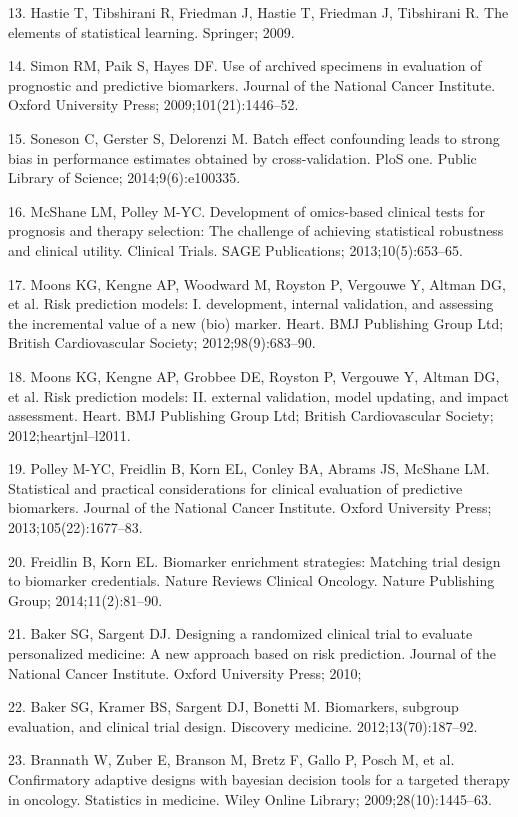\documentclass[11pt]{article}
\begin{document}
13. Hastie T, Tibshirani R, Friedman J, Hastie T, Friedman J, Tibshirani
R. The elements of statistical learning. Springer; 2009.

14. Simon RM, Paik S, Hayes DF. Use of archived specimens in evaluation
of prognostic and predictive biomarkers. Journal of the National Cancer
Institute. Oxford University Press; 2009;101(21):1446--52.

15. Soneson C, Gerster S, Delorenzi M. Batch effect confounding leads to
strong bias in performance estimates obtained by cross-validation. PloS
one. Public Library of Science; 2014;9(6):e100335.

16. McShane LM, Polley M-YC. Development of omics-based clinical tests
for prognosis and therapy selection: The challenge of achieving
statistical robustness and clinical utility. Clinical Trials. SAGE
Publications; 2013;10(5):653--65.

17. Moons KG, Kengne AP, Woodward M, Royston P, Vergouwe Y, Altman DG,
et al. Risk prediction models: I. development, internal validation, and
assessing the incremental value of a new (bio) marker. Heart. BMJ
Publishing Group Ltd; British Cardiovascular Society;
2012;98(9):683--90.

18. Moons KG, Kengne AP, Grobbee DE, Royston P, Vergouwe Y, Altman DG,
et al. Risk prediction models: II. external validation, model updating,
and impact assessment. Heart. BMJ Publishing Group Ltd; British
Cardiovascular Society; 2012;heartjnl--l2011.

19. Polley M-YC, Freidlin B, Korn EL, Conley BA, Abrams JS, McShane LM.
Statistical and practical considerations for clinical evaluation of
predictive biomarkers. Journal of the National Cancer Institute. Oxford
University Press; 2013;105(22):1677--83.

20. Freidlin B, Korn EL. Biomarker enrichment strategies: Matching trial
design to biomarker credentials. Nature Reviews Clinical Oncology.
Nature Publishing Group; 2014;11(2):81--90.

21. Baker SG, Sargent DJ. Designing a randomized clinical trial to
evaluate personalized medicine: A new approach based on risk prediction.
Journal of the National Cancer Institute. Oxford University Press; 2010;

22. Baker SG, Kramer BS, Sargent DJ, Bonetti M. Biomarkers, subgroup
evaluation, and clinical trial design. Discovery medicine.
2012;13(70):187--92.

23. Brannath W, Zuber E, Branson M, Bretz F, Gallo P, Posch M, et al.
Confirmatory adaptive designs with bayesian decision tools for a
targeted therapy in oncology. Statistics in medicine. Wiley Online
Library; 2009;28(10):1445--63.
\end{document}
